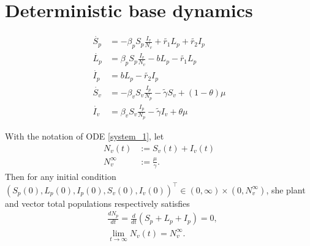 \section{Deterministic base dynamics}

\begin{equation} 
	\label{system_1} 
	\begin{aligned} 
		\dot{S_p} &= 
			-\beta_p S_p
			\frac{I_v}{N_v} + \tilde{r_1} L_p + \tilde{r_2} I_p  
		\\ 
		\dot{L_p} &= 
			\beta_p S_p
			\frac{I_v}{N_v} - b L_p - \tilde{r_1} L_p  
		\\ 
		\dot{I_p} &= 
			b L_p - \tilde{r_2} I_p  \\ 
		\dot{S_v} &= 
			-\beta_v S_v 
			\frac{I_p}{N_p} - \tilde{\gamma} S_v
			+(1-\theta) \mu  
		\\ 
		\dot{I_v} &= 
			\beta_v S_v \frac{I_p}{N_p} 
			- \tilde{\gamma} I_v
			+ \theta \mu 
	\end{aligned} 
\end{equation} 

\begin{theorem}\label{theorem_1}
	With the notation of ODE \eqref{system_1}, let
	\begin{equation*}
		\begin{aligned}
			N_v(t) &:= S_v(t) + I_v(t) 
		 	\\
		 	N_v^{\infty} &:= \frac{\mu}{\gamma}.
		 \end{aligned}
	\end{equation*}
	Then for any initial condition 
	$
		(S_p(0), L_p(0), I_p(0), S_v(0), I_v(0) )^\top
	 	\in {(0,\infty) \times (0, N^\infty_v)}
	$, she plant and vector total populations respectively satisfies
	\begin{equation*}
		\begin{aligned}
			& \frac{d N_p}{dt} =
				\frac{d}{dt}(S_p + L_p + I_p) = 0,
			\\
			& \lim_{t\to \infty}
				N_v(t) = N_v^{\infty}.
		\end{aligned}
	\end{equation*}
\end{theorem}

